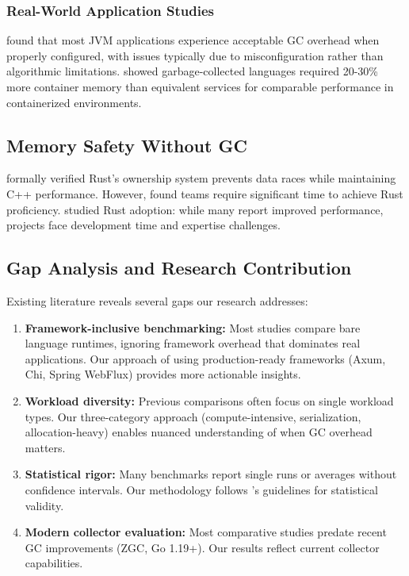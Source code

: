 \documentclass{article}
\begin{document}
\subsubsection{Real-World Application Studies}

\citet{tene2011c4} found that most JVM applications experience acceptable GC overhead when properly configured, with issues typically due to misconfiguration rather than algorithmic limitations. \citet{wang2020microservices} showed garbage-collected languages required 20-30\% more container memory than equivalent services for comparable performance in containerized environments.

\subsection{Memory Safety Without GC}

\citet{jung2017rustbelt} formally verified Rust's ownership system prevents data races while maintaining C++ performance. However, \citet{astrauskas2020learning} found teams require significant time to achieve Rust proficiency. \citet{emre2020adoption} studied Rust adoption: while many report improved performance, projects face development time and expertise challenges.

\subsection{Gap Analysis and Research Contribution}

Existing literature reveals several gaps our research addresses:

\begin{enumerate}
    \item \textbf{Framework-inclusive benchmarking:} Most studies compare bare language runtimes, ignoring framework overhead that dominates real applications. Our approach of using production-ready frameworks (Axum, Chi, Spring WebFlux) provides more actionable insights.
    
    \item \textbf{Workload diversity:} Previous comparisons often focus on single workload types. Our three-category approach (compute-intensive, serialization, allocation-heavy) enables nuanced understanding of when GC overhead matters.
    
    \item \textbf{Statistical rigor:} Many benchmarks report single runs or averages without confidence intervals. Our methodology follows \citet{kalibera2013rigorous}'s guidelines for statistical validity.
    
    \item \textbf{Modern collector evaluation:} Most comparative studies predate recent GC improvements (ZGC, Go 1.19+). Our results reflect current collector capabilities.
\end{enumerate}
\end{document}
